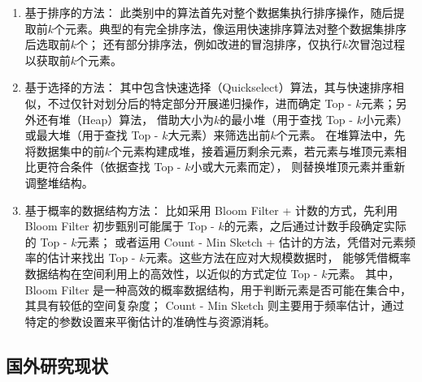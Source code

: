 \begin{enumerate}
\item{基于排序的方法}：
此类别中的算法首先对整个数据集执行排序操作，随后提取前\(k\)个元素。典型的有完全排序法，像运用快速排序算法对整个数据集排序后选取前\(k\)个；
还有部分排序法，例如改进的冒泡排序，仅执行\(k\)次冒泡过程以获取前\(k\)个元素\cite{sedgewick1978implementing}。

\item{基于选择的方法}：
其中包含快速选择（Quickselect）算法，其与快速排序相似，不过仅针对划分后的特定部分开展递归操作，进而确定 Top - \(k\)元素\cite{martinez2001optimal}；另外还有堆（Heap）算法，
借助大小为\(k\)的最小堆（用于查找 Top - \(k\)小元素）或最大堆（用于查找 Top - \(k\)大元素）来筛选出前\(k\)个元素。
在堆算法中，先将数据集中的前\(k\)个元素构建成堆，接着遍历剩余元素，若元素与堆顶元素相比更符合条件（依据查找 Top - \(k\)小或大元素而定），
则替换堆顶元素并重新调整堆结构。

\item{基于概率的数据结构方法}：
比如采用 Bloom Filter + 计数的方式，先利用 Bloom Filter 初步甄别可能属于 Top - \(k\)的元素，之后通过计数手段确定实际的 Top - \(k\)元素；
或者运用 Count - Min Sketch + 估计的方法，凭借对元素频率的估计来找出 Top - \(k\)元素。这些方法在应对大规模数据时，
能够凭借概率数据结构在空间利用上的高效性，以近似的方式定位 Top - \(k\)元素。
其中，Bloom Filter 是一种高效的概率数据结构，用于判断元素是否可能在集合中，其具有较低的空间复杂度\cite{luo2018optimizing}；
Count - Min Sketch 则主要用于频率估计，通过特定的参数设置来平衡估计的准确性与资源消耗\cite{cormode2005improved}。 
\end{enumerate}

\subsection{国外研究现状}



